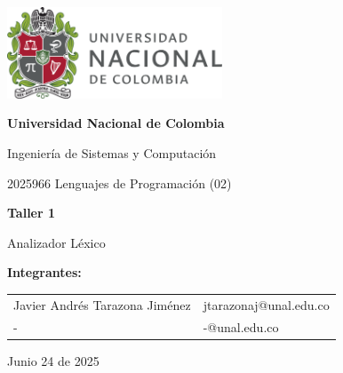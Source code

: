\documentclass{article}
\begin{document}
\begin{titlepage}
    \centering
    \includegraphics[width=0.48\textwidth]{logo_universidad.png}
    \par\vspace{2cm}

    {\Large \textbf{Universidad Nacional de Colombia} \par}
    \vspace{0.5cm}
    {\large Ingeniería de Sistemas y Computación \par}
    {\large 2025966 Lenguajes de Programación (02)\par}
    \vspace{3cm}

    {\large \textbf{Taller 1} \par}
    {\large Analizador Léxico\par}
    \vspace{3cm}

    {\large \textbf{Integrantes:} \par}
    \vspace{0.5cm}
    \begin{tabular}{ll}
    Javier Andrés Tarazona Jiménez & jtarazonaj@unal.edu.co \\
    - & -@unal.edu.co \\
    \end{tabular}
    \par\vspace{3cm}

    {\large Junio 24 de 2025 \par}
\end{titlepage}

\tableofcontents %

\newpage %


\end{document}
